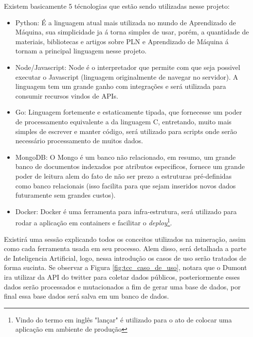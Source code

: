 Existem basicamente 5 técnologias que estão sendo utilizadas nesse projeto:
\begin{itemize}
 \item Python: É a linguagem atual mais utilizada no mundo de Aprendizado de Máquina, sua simplicidade ja á torna simples de usar, porém, a quantidade de materiais, bibliotecas e artigos sobre PLN e Aprendizado de Máquina á tornam a principal linguagem nesse projeto.
 \item Node/Javascript: Node é o interpretador que permite com que seja possivel executar o Javascript (linguagem originalmente de navegar no servidor). A linguagem tem um grande ganho com integrações e será utilizada para consumir recursos vindos de APIs.
 \item Go: Linguagem fortemente e estaticamente tipada, que fornecesse um poder de processamento equivalente a da linguagem C, entretando, muito mais simples de escrever e manter código, será utilizado para scripts onde serão necessário processamento de muitos dados.
 \item MongoDB: O Mongo é um banco não relacionado, em resumo, um grande banco de documentos indexados por atributos especificos, fornece um grande poder de leitura alem do fato de não ser prezo a estruturas pré-definidas como banco relacionais (isso facilita para que sejam inseridos novos dados futuramente sem grandes custos).
 \item Docker: Docker é uma ferramenta para infra-estrutura, será utilizado para rodar a aplicação em containers e facilitar o \textit{deploy}\footnote{Vindo do termo em inglês "lançar" é utilizado para o ato de colocar uma aplicação em ambiente de produção}.
\end{itemize}

Existirá uma sessão explicando todos os conceitos utilizados na mineração, assim como cada ferramenta usada em seu processo. Alem disso, será detalhada a parte  de Inteligencia Artificial, logo, nessa introdução os casos de uso serão tratados de forma sucinta. Se observar a Figura \ref{fig:tcc_caso_de_uso}, notara que o Dumont ira utilizar da API do twitter para coletar dados públicos, posteriormente esses dados serão processados e mutacionados a fim de gerar uma base de dados, por final essa base dados será salva em um banco de dados.

